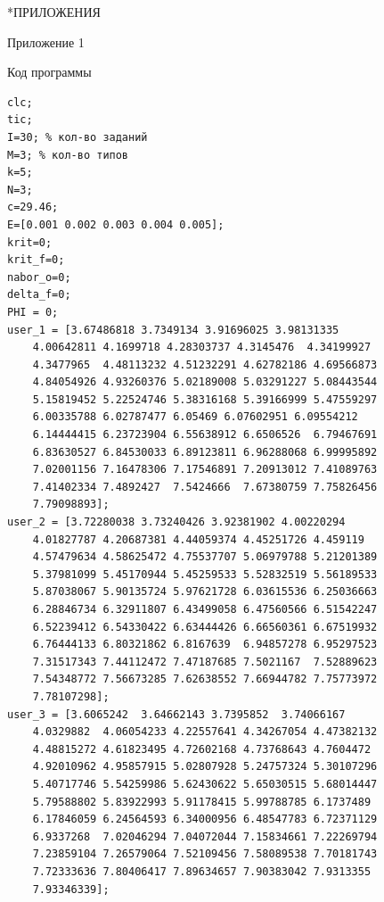 \documentclass[14pt, a4paper]{extarticle}
\makeatletter
\numberwithin{equation}{section}
\renewcommand{\section}{\@startsection{section}{1}{1.25cm}{-3.5ex plus -1ex minus -.2ex}{2.3ex plus.2ex}{\center\normalfont}}
\makeatother
\begin{document}
\newpage
\headsep=12cm
\begin{center} \section*{ПРИЛОЖЕНИЯ} \end{center}
\newpage
\headsep=25pt
\begin{flushright}
Приложение 1
\end{flushright}
\begin{center}
Код программы
\end{center}
\small
\begin{verbatim}
clc;
tic;
I=30; % кол-во заданий
M=3; % кол-во типов
k=5;
N=3;
c=29.46;
E=[0.001 0.002 0.003 0.004 0.005];
krit=0;
krit_f=0;
nabor_o=0;
delta_f=0;
PHI = 0;
user_1 = [3.67486818 3.7349134 3.91696025 3.98131335
    4.00642811 4.1699718 4.28303737 4.3145476  4.34199927
    4.3477965  4.48113232 4.51232291 4.62782186 4.69566873
    4.84054926 4.93260376 5.02189008 5.03291227 5.08443544
    5.15819452 5.22524746 5.38316168 5.39166999 5.47559297
    6.00335788 6.02787477 6.05469 6.07602951 6.09554212
    6.14444415 6.23723904 6.55638912 6.6506526  6.79467691
    6.83630527 6.84530033 6.89123811 6.96288068 6.99995892
    7.02001156 7.16478306 7.17546891 7.20913012 7.41089763
    7.41402334 7.4892427  7.5424666  7.67380759 7.75826456
    7.79098893];
user_2 = [3.72280038 3.73240426 3.92381902 4.00220294
    4.01827787 4.20687381 4.44059374 4.45251726 4.459119
    4.57479634 4.58625472 4.75537707 5.06979788 5.21201389
    5.37981099 5.45170944 5.45259533 5.52832519 5.56189533
    5.87038067 5.90135724 5.97621728 6.03615536 6.25036663
    6.28846734 6.32911807 6.43499058 6.47560566 6.51542247
    6.52239412 6.54330422 6.63444426 6.66560361 6.67519932
    6.76444133 6.80321862 6.8167639  6.94857278 6.95297523
    7.31517343 7.44112472 7.47187685 7.5021167  7.52889623
    7.54348772 7.56673285 7.62638552 7.66944782 7.75773972
    7.78107298];
user_3 = [3.6065242  3.64662143 3.7395852  3.74066167
    4.0329882  4.06054233 4.22557641 4.34267054 4.47382132
    4.48815272 4.61823495 4.72602168 4.73768643 4.7604472
    4.92010962 4.95857915 5.02807928 5.24757324 5.30107296
    5.40717746 5.54259986 5.62430622 5.65030515 5.68014447
    5.79588802 5.83922993 5.91178415 5.99788785 6.1737489
    6.17846059 6.24564593 6.34000956 6.48547783 6.72371129
    6.9337268  7.02046294 7.04072044 7.15834661 7.22269794
    7.23859104 7.26579064 7.52109456 7.58089538 7.70181743
    7.72333636 7.80406417 7.89634657 7.90383042 7.9313355
    7.93346339];


\end{verbatim}
\end{document}
